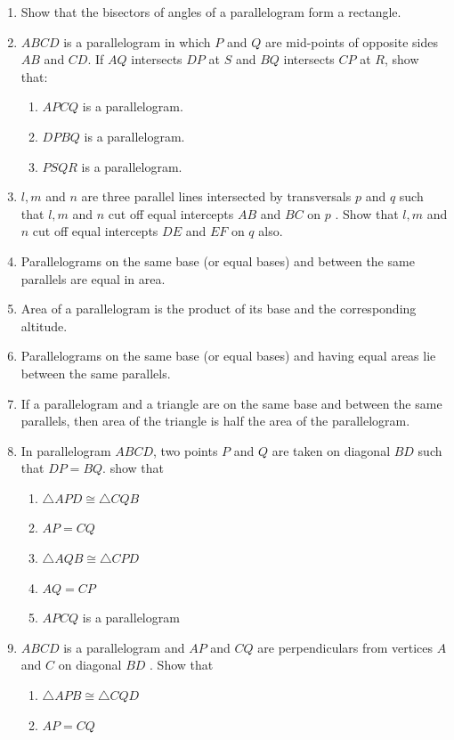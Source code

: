 \begin{enumerate}[label=\arabic*.,ref=\thesubsection.\theenumi]
%
\item Show that the bisectors of angles of a parallelogram form a rectangle.
%
%
\item $ABCD$ is a parallelogram in which $P$ and $Q$ are mid-points of opposite sides $AB$ and $CD$. If $AQ$ intersects $DP$ at $S$ and $BQ$ intersects $CP$ at $R$, show that: 
%
\begin{enumerate}
\item  $APCQ$ is a parallelogram. 
\item $DPBQ$ is a parallelogram. 
\item $PSQR$ is a parallelogram.
\end{enumerate}
%
\item $l, m$ and $n$ are three parallel lines intersected by transversals $p$ and $q$ such that $l, m$ and $n$ cut off equal intercepts $AB$ and $BC$ on $p$ . Show that $l, m$ and $n$ cut off equal intercepts $DE$ and $EF$ on $q$ also.
%
\item Parallelograms on the same base (or equal bases) and between the same parallels are equal in area.
\item Area of a parallelogram is the product of its base and the corresponding altitude. 
\item Parallelograms on the same base (or equal bases) and having equal areas lie between the same parallels.
\item If a parallelogram and a triangle are on the same base and between the same parallels, then area of the triangle is half the area of the parallelogram.
\item In parallelogram $ABCD$, two points $P$ and $Q$ are taken on diagonal $BD$ such that $DP = BQ$. show that \begin{enumerate}
 \item  $\triangle  APD  \cong   \triangle  CQB$ 
\item $AP = CQ$ \item  $\triangle  AQB  \cong   \triangle  CPD$ 
\item $AQ = CP$ 
\item $APCQ$ is a parallelogram
\end{enumerate}
\item $ABCD$ is a parallelogram and $AP$ and $CQ$ are perpendiculars from vertices $A$ and $C$ on diagonal $BD$ . Show that 
\begin{enumerate} 
\item  $\triangle  APB  \cong   \triangle  CQD $ 
\item $AP = CQ$
\end{enumerate}

\end{enumerate}
